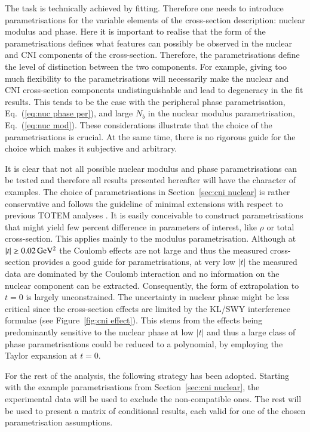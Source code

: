 The task is technically achieved by fitting. Therefore one needs to introduce parametrisations for the variable elements of the cross-section description: nuclear modulus and phase. Here it is important to realise that the form of the parametrisations defines what features can possibly be observed in the nuclear and CNI components of the cross-section. Therefore, the parametrisations define the level of distinction between the two components. For example, giving too much flexibility to the parametrisations will necessarily make the nuclear and CNI cross-section components undistinguishable and lead to degeneracy in the fit results. This tends to be the case with the peripheral phase parametrisation, Eq.~(\ref{eq:nuc phase per}), and large $N_b$ in the nuclear modulus parametrisation, Eq.~(\ref{eq:nuc mod}). These considerations illustrate that the choice of the parametrisations is crucial. At the same time, there is no rigorous guide for the choice which makes it subjective and arbitrary.

It is clear that not all possible nuclear modulus and phase parametrisations can be tested and therefore all results presented hereafter will have the character of examples. The choice of parametrisations in Section~\ref{sec:cni nuclear} is rather conservative and follows the guideline of minimal extensions with respect to previous TOTEM analyses \cite{8tev-90m}. It is easily conceivable to construct parametrisations that might yield few percent difference in parameters of interest, like $\rho$ or total cross-section. This applies mainly to the modulus parametrisation. Although at $|t| \gtrsim 0.02\,{\rm GeV^2}$ the Coulomb effects are not large and thus the measured cross-section provides a good guide for parametrisations, at very low $|t|$ the measured data are dominated by the Coulomb interaction and no information on the nuclear component can be extracted. Consequently, the form of extrapolation to $t = 0$ is largely unconstrained. The uncertainty in nuclear phase might be less critical since the cross-section effects are limited by the KL/SWY interference formulae (see Figure~\ref{fig:cni effect}). This stems from the effects being predominantly sensitive to the nuclear phase at low $|t|$ and thus a large class of phase parametrisations could be reduced to a polynomial, by employing the Taylor expansion at $t = 0$.

For the rest of the analysis, the following strategy has been adopted. Starting with the example parametrisations from Section~\ref{sec:cni nuclear}, the experimental data will be used to exclude the non-compatible ones. The rest will be used to present a matrix of conditional results, each valid for one of the chosen parametrisation assumptions.



